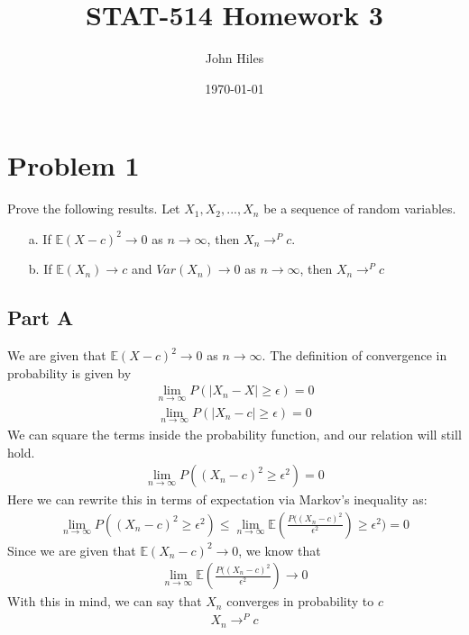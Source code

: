 \documentclass{article}
\title{STAT-514 Homework 3}
\author{John Hiles}
\date\today
\begin{document}
\maketitle %

\section*{Problem 1}
Prove the following results. Let $X_1, X_2,..., X_n$ be a sequence of random variables.
\begin{enumerate}
\item[a.] If $\mathbb{E}(X-c)^2 \rightarrow 0$ as $n \rightarrow \infty$, then $X_n \rightarrow^P c$.
\item[b.] If $\mathbb{E}(X_n) \rightarrow c$ and $Var(X_n) \rightarrow 0$ as $n \rightarrow \infty$, then $X_n \rightarrow^P c$
\end{enumerate}
\subsection*{Part A}
We are given that $\mathbb{E}(X-c)^2 \rightarrow 0$ as $n \rightarrow \infty$.
The definition of convergence in probability is given by
\begin{align*}
\lim_{n\rightarrow \infty} P(|X_n-X| \geq \epsilon) = 0
\end{align*}
\begin{align*}
\lim_{n\rightarrow \infty} P(|X_n-c| \geq \epsilon) = 0
\end{align*}
We can square the terms inside the probability function, and our relation will still hold.
\begin{align*}
\lim_{n\rightarrow \infty} P((X_n-c)^2 \geq \epsilon^2) = 0
\end{align*}
Here we can rewrite this in terms of expectation  via Markov's inequality as:
\begin{align*}
\lim_{n\rightarrow \infty} P((X_n-c)^2 \geq \epsilon^2) \leq \lim_{n\rightarrow \infty} \mathbb{E}(\frac{P((X_n-c)^2}{\epsilon^2}) \geq \epsilon^2) = 0
\end{align*}
Since we are given that $\mathbb{E}(X_n-c)^2 \rightarrow 0$, we know that
\begin{align*}
\lim_{n\rightarrow \infty} \mathbb{E}(\frac{P((X_n-c)^2}{\epsilon^2}) \rightarrow 0
\end{align*}
With this in mind, we can say that $X_n$ converges in probability to $c$
\begin{align*}
\boxed{ X_n \rightarrow^P c }
\end{align*}
\end{document}
